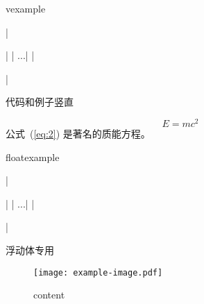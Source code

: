 \documentclass{xdyy-usermanual}
\begin{document}
\begin{function}{vexample}
  \begin{syntax}
    |\begin{vexample}|
      |    ...|
    |\end{vexample}|
  \end{syntax}
  代码和例子竖直
\end{function}
\begin{vexample}
    \begin{equation}\label{eq:2}
      E = mc^2
    \end{equation}
    公式~(\ref{eq:2}) 是著名的质能方程。
\end{vexample}


\begin{function}{floatexample}
  \begin{syntax}
    |\begin{floatexample}|
      |    ...|
    |\end{floatexample}|
  \end{syntax}
  浮动体专用
\end{function}
\begin{floatexample}
    \begin{figure}[htbp]
      \centering
      \texttt{[image: example-image.pdf]}
      \caption{content}
    \end{figure}
    \end{floatexample}
\end{document}
